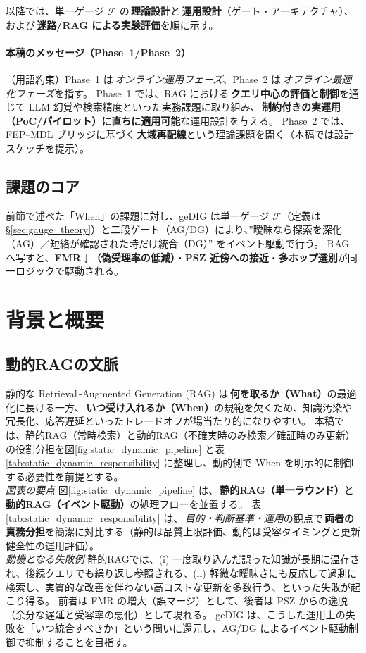 \documentclass[ja=standard,xelatex]{bxjsarticle}
\newcommand{\F}{\mathcal{F}}
\begin{document}
以降では、単一ゲージ $\F$ の\,\textbf{理論設計}と\,\textbf{運用設計}（ゲート・アーキテクチャ）、および\,\textbf{迷路/RAG による実験評価}を順に示す。

\paragraph{本稿のメッセージ（Phase~1/Phase~2）}
（用語約束）Phase~1 は\,\emph{オンライン運用フェーズ}、Phase~2 は\,\emph{オフライン最適化フェーズ}を指す。
Phase~1 では、RAG における\,\textbf{クエリ中心の評価と制御}を通じて LLM 幻覚や検索精度といった実務課題に取り組み、\,\textbf{制約付きの実運用（PoC/パイロット）に直ちに適用可能}な運用設計を与える。
Phase~2 では、FEP–MDL ブリッジに基づく\,\textbf{大域再配線}という理論課題を開く（本稿では設計スケッチを提示）。

\subsection{課題のコア}\label{sec:intro_core}
前節で述べた「When」の課題に対し、geDIG は単一ゲージ $\F$（定義は §\ref{sec:gauge_theory}）と二段ゲート（AG/DG）により、”曖昧なら探索を深化（AG）／短絡が確認された時だけ統合（DG）” をイベント駆動で行う。
RAG へ写すと、\textbf{FMR$\downarrow$（偽受理率の低減）}・\textbf{PSZ 近傍への接近}・\textbf{多ホップ選別}が同一ロジックで駆動される。

\section{背景と概要}\label{sec:background_overview}

\subsection{動的RAGの文脈}
静的な Retrieval\,\mbox{-}Augmented Generation (RAG) は\,\textbf{何を取るか（What）}の最適化に長ける一方、\,\textbf{いつ受け入れるか（When）}の規範を欠くため、知識汚染や冗長化、応答遅延といったトレードオフが場当たり的になりやすい。
本稿では、静的RAG（常時検索）と動的RAG（不確実時のみ検索／確証時のみ更新）の役割分担を図\ref{fig:static_dynamic_pipeline} と表\ref{tab:static_dynamic_responsibility} に整理し、動的側で When を明示的に制御する必要性を前提とする。
\\
\noindent\textit{図表の要点}\; 図\ref{fig:static_dynamic_pipeline} は、\,\textbf{静的RAG（単一ラウンド）}と\,\textbf{動的RAG（イベント駆動）}の処理フローを並置する。
表\ref{tab:static_dynamic_responsibility} は、\,\emph{目的・判断基準・運用}の観点で\,\textbf{両者の責務分担}を簡潔に対比する（静的は品質上限評価、動的は受容タイミングと更新健全性の運用評価）。
\\
\noindent\textit{動機となる失敗例}\; 静的RAGでは、(i) 一度取り込んだ誤った知識が長期に温存され、後続クエリでも繰り返し参照される、(ii) 軽微な曖昧さにも反応して過剰に検索し、実質的な改善を伴わない高コストな更新を多数行う、といった失敗が起こり得る。
前者は FMR の増大（誤マージ）として、後者は PSZ からの逸脱（余分な遅延と受容率の悪化）として現れる。
geDIG は、こうした運用上の失敗を「いつ統合すべきか」という問いに還元し、AG/DG によるイベント駆動制御で抑制することを目指す。
\end{document}
